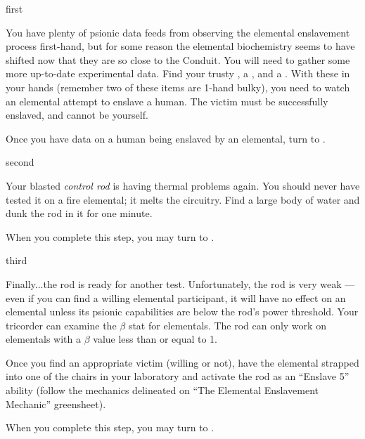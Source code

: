 \documentclass[notebook]{elementals}
\begin{document}

\startnotebook{\nEnslavementResearch{}}

\begin{page}{first}

You have plenty of psionic data feeds from observing the elemental enslavement process first-hand, but for some reason the elemental biochemistry seems to have shifted now that they are so close to the Conduit. You will need to gather	 some more up-to-date experimental data. Find your trusty \tricorder{}, a \photodiode{}, and a \coffeemug{}. With these in your hands (remember two of these items are 1-hand bulky), you need to watch an elemental attempt to enslave a human. The victim must be successfully enslaved, and cannot be yourself.

Once you have data on a human being enslaved by an elemental, turn to .

\end{page}

\begin{page}{second}

Your blasted \emph{control rod} is having thermal problems again. You should never have tested it on a fire elemental; it melts the circuitry. Find a large body of water and dunk the rod in it for one minute.

When you complete this step, you may turn to .

\end{page}

\begin{page}{third}

Finally...the rod is ready for another test. Unfortunately, the rod is very weak --- even if you can find a willing elemental participant, it will have no effect on an elemental unless its psionic capabilities are below the rod's power threshold. Your tricorder can examine the $\beta$ stat for elementals. The rod can only work on elementals with a $\beta$ value less than or equal to 1.

Once you find an appropriate victim (willing or not), have the elemental strapped into one of the chairs in your laboratory and activate the rod as an ``Enslave 5'' ability (follow the mechanics delineated on ``The Elemental Enslavement Mechanic'' greensheet).

When you complete this step, you may turn to .

\end{page}
\end{document}

